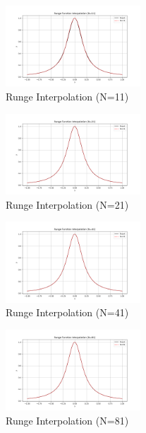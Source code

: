 \documentclass[a4paper]{article}
\begin{document}
\begin{figure}[H]
    \centering
    \includegraphics[width=0.45\textwidth]{figure/runge_interpolation_N11.png}
    \caption{Runge Interpolation (N=11)}
    \label{fig:runge_N11}
\end{figure}

\begin{figure}[H]
    \centering
    \includegraphics[width=0.45\textwidth]{figure/runge_interpolation_N21.png}
    \caption{Runge Interpolation (N=21)}
    \label{fig:runge_N21}
\end{figure}

\begin{figure}[H]
    \centering
    \includegraphics[width=0.45\textwidth]{figure/runge_interpolation_N41.png}
    \caption{Runge Interpolation (N=41)}
    \label{fig:runge_N41}
\end{figure}

\begin{figure}[H]
    \centering
    \includegraphics[width=0.45\textwidth]{figure/runge_interpolation_N81.png}
    \caption{Runge Interpolation (N=81)}
    \label{fig:runge_N81}
\end{figure}
\end{document}
